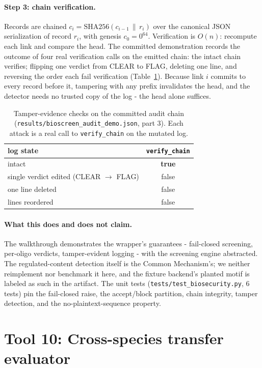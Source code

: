 \documentclass[12pt]{article}
\begin{document}
\paragraph{Step 3: chain verification.}
Records are chained $c_i = \mathrm{SHA256}(c_{i-1} \,\|\, r_i)$ over the
canonical JSON serialization of record $r_i$, with genesis $c_0 = 0^{64}$.
Verification is $O(n)$: recompute each link and compare the head. The
committed demonstration records the outcome of four real verification calls
on the emitted chain: the intact chain verifies; flipping one verdict from
CLEAR to FLAG, deleting one line, and reversing the order each fail
verification (Table~\ref{tab:tamper}). Because link $i$ commits to every
record before it, tampering with any prefix invalidates the head, and the
detector needs no trusted copy of the log - the head alone suffices.

\begin{table}[t]
\centering
\caption{Tamper-evidence checks on the committed audit chain
(\texttt{results/bioscreen\_audit\_demo.json}, part 3). Each attack is a
real call to \texttt{verify\_chain} on the mutated log.}
\label{tab:tamper}
\begin{tabular}{lc}
\hline
log state & \texttt{verify\_chain} \\
\hline
intact & \textbf{true} \\
single verdict edited (CLEAR $\to$ FLAG) & false \\
one line deleted & false \\
lines reordered & false \\
\hline
\end{tabular}
\end{table}

\paragraph{What this does and does not claim.}
The walkthrough demonstrates the wrapper's guarantees - fail-closed
screening, per-oligo verdicts, tamper-evident logging - with the screening
engine abstracted. The regulated-content detection itself is the Common
Mechanism's; we neither reimplement nor benchmark it here, and the fixture
backend's planted motif is labeled as such in the artifact. The unit tests
(\texttt{tests/test\_biosecurity.py}, 6 tests) pin the fail-closed raise,
the accept/block partition, chain integrity, tamper detection, and the
no-plaintext-sequence property.

\section{Tool 10: Cross-species transfer evaluator}
\end{document}
